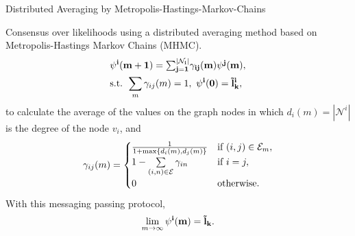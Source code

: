 \documentclass{beamer}
\newcommand{\vect}{\bf}
\theoremstyle{remark}
\begin{document}
\begin{frame}{Distributed Averaging by Metropolis-Hastings-Markov-Chains}

Consensus over likelihoods using a distributed averaging method based on Metropolis-Hastings Markov Chains (MHMC). 
\begin{align*}
&\vect{\psi}^i(m+1)=\textstyle {\sum\nolimits _{j=1}^{|\mathcal{N}_{i}|}} \gamma_{ij}(m)\vect{\psi}^j(m),\\
& \text{s.t. } \sum_{m}  \gamma_{ij}(m) = 1,\,\,  \vect{\psi}^i(0)=  \tilde{l}_k^i,\nonumber
\end{align*}
to calculate the average of the values on the graph nodes in which $d_{i}(m)=|\mathcal{N}^i|$ is the degree of the node $v_i$, and 
\begin{equation*}
\label{eq:mhmc}
\gamma_{ij}(m) =
\begin{cases}
{1\over 1+\max\{d_{i}(m),d_{j}(m)\}}      &  \text{if } (i,j) \in \mathcal{E}_{m}, \\
1-\sum\limits_{{(i,n)} \in \mathcal{E}}\gamma_{in}  &  \text{if } i = j,\\
0 & \text{otherwise}.
\end{cases}
\end{equation*}
With this messaging passing protocol, $$\lim_{m\rightarrow \infty} \vect{\psi}^i(m) = \tilde{l}_k.$$

	
\end{frame}
\end{document}
